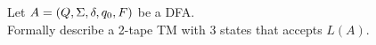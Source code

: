 Let $A = (Q, \Sigma, \delta, q_0, F)$ be a DFA. \\
Formally describe a 2-tape TM with 3 states that accepts $L(A)$.




\newline